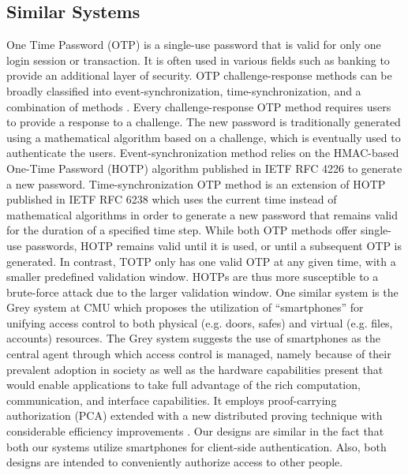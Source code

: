 \documentclass[conference]{IEEEtran}
\begin{document}
\subsection{Similar Systems}
	One Time Password (OTP) is a single-use password that is valid for only one login session or transaction. It is often used in various fields such as banking to provide an additional layer of security. OTP challenge-response methods can be broadly classified into event-synchronization, time-synchronization, and a combination of methods \cite{ab4} \cite{ab5}. Every challenge-response OTP method requires users to provide a response to a challenge. The new password is traditionally generated using a mathematical algorithm based on a challenge, which is eventually used to authenticate the users. Event-synchronization method relies on the HMAC-based One-Time Password (HOTP) algorithm published in IETF RFC 4226 \cite{ab6} to generate a new password. Time-synchronization OTP method is an extension of HOTP published in IETF RFC 6238 \cite{ab7} which uses the current time instead of mathematical algorithms in order to generate a new password that remains valid for the duration of a specified time step. While both OTP methods offer single-use passwords, HOTP remains valid until it is used, or until a subsequent OTP is generated. In contrast, TOTP only has one valid OTP at any given time, with a smaller predefined validation window. HOTPs are thus more susceptible to a brute-force attack due to the larger validation window.
	One similar system is the Grey system at CMU which proposes the utilization of “smartphones” for unifying access control to both physical (e.g. doors, safes) and virtual (e.g. files, accounts) resources. The Grey system suggests the use of smartphones as the central agent through which access control is managed, namely because of their prevalent adoption in society as well as the hardware capabilities present that would enable applications to take full advantage of the rich computation, communication, and interface capabilities. It employs proof-carrying authorization (PCA) \cite{ab8} extended with a new distributed proving technique with considerable efficiency improvements \cite{ab9}. Our designs are similar in the fact that both our systems utilize smartphones for client-side authentication. Also, both designs are intended to conveniently authorize access to other people. 
\end{document}
